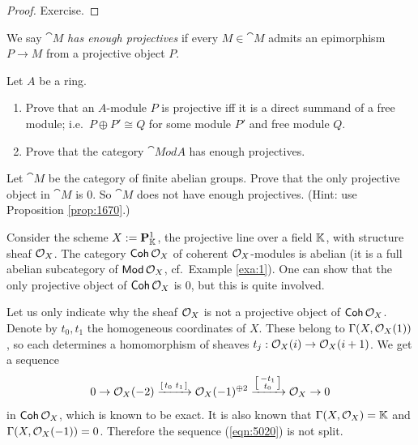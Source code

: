 \begin{proof}
Exercise.
\end{proof}

\begin{dfn}
We say $\cat{M}$ {\em has enough projectives} if every $M \in \cat{M}$ admits
an epimorphism $P \to M$ from a projective object $P$. 
\end{dfn}

\begin{exer} \label{exer:1670}
Let $A$ be a ring. 
\begin{enumerate}
\item Prove that an $A$-module $P$ is projective iff it is a 
direct summand of a free module; i.e.\ $P \oplus P' \cong Q$ for some module 
$P'$ and free module $Q$.

\item Prove that the category $\cat{Mod} A$ has enough projectives.
\end{enumerate} 
\end{exer}

\begin{exer} \label{exer:1675}
Let $\cat{M}$ be the category of finite abelian groups.
Prove that the only projective object in $\cat{M}$ is $0$. So $\cat{M}$ does 
not have enough projectives.
(Hint: use Proposition \ref{prop:1670}.)
\end{exer}

\begin{exa} \label{exa:2870}
Consider the scheme $X := \mathbf{P}^1_{\mathbb{K}}$, the projective line over a field
$\mathbb{K}$, with structure sheaf $\mathcal{O}_X$. 
The category $\operatorname{\mathsf{Coh}} \mathcal{O}_X$ of coherent $\mathcal{O}_X$-modules is
abelian (it is a full abelian subcategory of $\operatorname{\mathsf{Mod}} \mathcal{O}_X$, cf.\ 
Example \ref{exa:1}). One can show that the only projective object of 
$\operatorname{\mathsf{Coh}} \mathcal{O}_X$ is $0$, but this is quite involved. 

Let us only indicate why the sheaf $\mathcal{O}_X$ is not a projective
object of $\operatorname{\mathsf{Coh}} \mathcal{O}_X$. 
Denote by $t_0, t_1$ the homogeneous coordinates of $X$. These belong to 
$\Gamma(X, \mathcal{O}_X(1))$, so each determines a homomorphism of sheaves
$t_j : \mathcal{O}_X(i) \to \mathcal{O}_X(i+1)$. We get a sequence 
\begin{equation} \label{eqn:5020}
0 \to \mathcal{O}_X(-2) \xrightarrow{\left[ \begin{smallmatrix} t_0 & t_1 \end{smallmatrix} \right]} \mathcal{O}_X(-1)^{\oplus 2} 
\xrightarrow{\left[ \begin{smallmatrix} -t_1 \\ t_0 \end{smallmatrix} \right]} \mathcal{O}_X \to 0
\end{equation}
in $\operatorname{\mathsf{Coh}} \mathcal{O}_X$, which is known to be exact.
It is also known that 
$\Gamma(X, \mathcal{O}_X) = \mathbb{K}$ and  
$\Gamma(X, \mathcal{O}_X(-1)) = 0$. Therefore the sequence (\ref{eqn:5020}) is not 
split. 
\end{exa}



